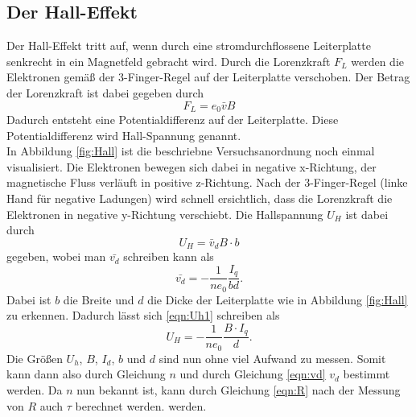 \subsection{Der Hall-Effekt}
Der Hall-Effekt tritt auf, wenn durch eine stromdurchflossene Leiterplatte senkrecht in ein Magnetfeld 
gebracht wird. Durch die Lorenzkraft $F_L$ werden die Elektronen gemäß der 3-Finger-Regel auf der Leiterplatte
verschoben. Der Betrag der Lorenzkraft ist dabei gegeben durch
\begin{equation}
    F_L=e_0\bar{v}B
\end{equation} 
Dadurch entsteht eine Potentialdifferenz auf der Leiterplatte. Diese Potentialdifferenz wird 
Hall-Spannung genannt. \\
In Abbildung \ref{fig:Hall} ist die beschriebne Versuchsanordnung noch einmal visualisiert.
Die Elektronen bewegen sich dabei in negative x-Richtung, der magnetische Fluss verläuft in positive z-Richtung.
Nach der 3-Finger-Regel (linke Hand für negative Ladungen) wird schnell ersichtlich, dass die Lorenzkraft die 
Elektronen in negative y-Richtung verschiebt.
%
%
Die Hallspannung $U_H$ ist dabei durch
\begin{equation}
    U_H=\bar{v}_dB\cdot b \label{eqn:Uh1}
\end{equation}
gegeben, wobei man $\bar{v_d}$ schreiben kann als 
\begin{equation}
    \bar{v_d}=-\frac{1}{ne_0}\frac{I_q}{bd}. \label{eqn:vd}
\end{equation}
Dabei ist $b$ die Breite und $d$ die Dicke der Leiterplatte wie in Abbildung \ref{fig:Hall} zu erkennen.
Dadurch lässt sich \eqref{eqn:Uh1} schreiben als 
\begin{equation}
    U_H=-\frac{1}{ne_0}\frac{B\cdot I_q}{d}. \label{eqn:Uh2}
\end{equation}
Die Größen $U_h$, $B$, $I_d$, $b$ und $d$ sind nun ohne viel Aufwand zu messen. Somit kann dann also durch 
Gleichung \label{eqn:Uh2} $n$ und durch Gleichung \ref{eqn:vd} $v_d$ bestimmt werden. Da $n$ nun bekannt ist,
kann durch Gleichung \ref{eqn:R} nach der Messung von $R$ auch $\tau$ berechnet werden.
werden.\\
